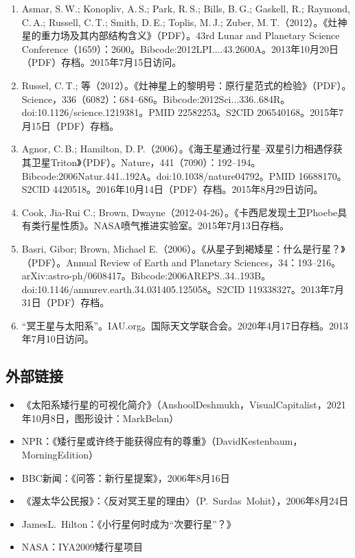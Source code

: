 \begin{enumerate}
\item Asmar, S.\,W.; Konopliv, A.\,S.; Park, R.\,S.; Bills, B.\,G.; Gaskell, R.; Raymond, C.\,A.; Russell, C.\,T.; Smith, D.\,E.; Toplis, M.\,J.; Zuber, M.\,T.（2012）。《灶神星的重力场及其内部结构含义》（PDF）。43rd Lunar and Planetary Science Conference（1659）：2600。Bibcode:2012LPI....43.2600A。2013年10月20日（PDF）存档。2015年7月15日访问。
\item Russel, C.\,T.; 等（2012）。《灶神星上的黎明号：原行星范式的检验》（PDF）。Science，336（6082）：684–686。Bibcode:2012Sci...336..684R。doi:10.1126/science.1219381。PMID 22582253。S2CID 206540168。2015年7月15日（PDF）存档。
\item Agnor, C.\,B.; Hamilton, D.\,P.（2006）。《海王星通过行星–双星引力相遇俘获其卫星Triton》（PDF）。Nature，441（7090）：192–194。Bibcode:2006Natur.441..192A。doi:10.1038/nature04792。PMID 16688170。S2CID 4420518。2016年10月14日（PDF）存档。2015年8月29日访问。
\item Cook, Jia-Rui C.; Brown, Dwayne（2012-04-26）。《卡西尼发现土卫Phoebe具有类行星性质》。NASA喷气推进实验室。2015年7月13日存档。
\item Basri, Gibor; Brown, Michael E.（2006）。《从星子到褐矮星：什么是行星？》（PDF）。Annual Review of Earth and Planetary Sciences，34：193–216。arXiv:astro-ph/0608417。Bibcode:2006AREPS..34..193B。doi:10.1146/annurev.earth.34.031405.125058。S2CID 119338327。2013年7月31日（PDF）存档。
\item “冥王星与太阳系”。IAU.org。国际天文学联合会。2020年4月17日存档。2013年7月10日访问。
\end{enumerate}
\subsection{外部链接}
\begin{itemize}
\item 《太阳系矮行星的可视化简介》（AnshoolDeshmukh，VisualCapitalist，2021年10月8日，图形设计：MarkBelan）
\item NPR：《矮行星或许终于能获得应有的尊重》（DavidKestenbaum，MorningEdition）
\item BBC新闻：《问答：新行星提案》，2006年8月16日
\item 《渥太华公民报》：〈反对冥王星的理由〉（P.~Surdas~Mohit），2006年8月24日
\item JamesL.~Hilton：《小行星何时成为“次要行星”？》
\item NASA：IYA2009矮行星项目
\end{itemize}
